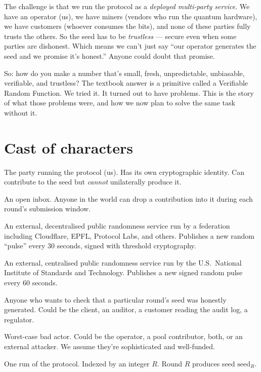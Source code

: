 \documentclass[11pt]{article}
\begin{document}
The challenge is that we run the protocol as a \emph{deployed multi-party service}. We have an operator (us), we have miners (vendors who run the quantum hardware), we have customers (whoever consumes the bits), and none of these parties fully trusts the others. So the seed has to be \emph{trustless} --- secure even when some parties are dishonest. Which means we can't just say ``our operator generates the seed and we promise it's honest.'' Anyone could doubt that promise.

So: how do you make a number that's small, fresh, unpredictable, unbiasable, verifiable, and trustless? The textbook answer is a primitive called a Verifiable Random Function. We tried it. It turned out to have problems. This is the story of what those problems were, and how we now plan to solve the same task without it.

\section*{Cast of characters}

\begin{description}[leftmargin=0pt, itemsep=4pt]
\item[Operator.] The party running the protocol (us). Has its own cryptographic identity. Can contribute to the seed but \emph{cannot} unilaterally produce it.
\item[Public contribution pool.] An open inbox. Anyone in the world can drop a contribution into it during each round's submission window.
\item[drand beacon.] An external, decentralised public randomness service run by a federation including Cloudflare, EPFL, Protocol Labs, and others. Publishes a new random ``pulse'' every 30 seconds, signed with threshold cryptography.
\item[NIST randomness beacon.] An external, centralised public randomness service run by the U.S.\ National Institute of Standards and Technology. Publishes a new signed random pulse every 60 seconds.
\item[Verifier.] Anyone who wants to check that a particular round's seed was honestly generated. Could be the client, an auditor, a customer reading the audit log, a regulator.
\item[Adversary.] Worst-case bad actor. Could be the operator, a pool contributor, both, or an external attacker. We assume they're sophisticated and well-funded.
\item[Round.] One run of the protocol. Indexed by an integer $R$. Round $R$ produces seed $\text{seed}_R$.
\end{description}
\end{document}
